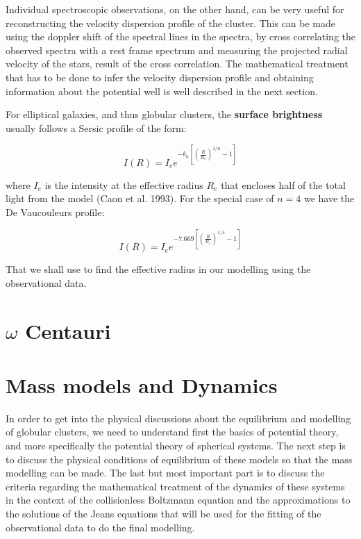 Individual spectroscopic observations, on the other hand, can be very useful for reconstructing the velocity dispersion profile of the cluster. This can be made using the doppler shift of the spectral lines in the spectra, by cross correlating the observed spectra with a rest frame spectrum and measuring the projected radial velocity of the stars, result of the cross correlation. The mathematical treatment that has to be done to infer the velocity dispersion profile and obtaining information about the potential well is well described in the next section.

For elliptical galaxies, and thus globular clusters, the \textbf{surface brightness} usually follows a Sersic profile of the form: 

\begin{equation}
I(R)=I_{e}e^{-b_{n}\left[\left(\frac{R}{R_{e}}\right)^{1/n}-1\right]}
\end{equation}

where $I_{e}$ is the intensity at the effective radius $R_{e}$ that encloses half of the total light from the model (Caon et al. 1993). For the special case of $n=4$ we have the De Vaucouleurs profile:

\begin{equation}
I(R)=I_{e}e^{-7.669\left[\left(\frac{R}{R_{e}}\right)^{1/4}-1\right]}
\end{equation}

That we shall use to find the effective radius in our modelling using the observational data.

\section{$\omega$ Centauri}

\section{Mass models and Dynamics}

In order to get into the physical discussions about the equilibrium and modelling of globular clusters, we need to understand first the basics of potential theory, and more specifically the potential theory of spherical systems. The next step is to discuss the physical conditions of equilibrium of these models so that the mass modelling can be made. The last but most important part is to discuss the criteria regarding the mathematical treatment of the dynamics of these systems in the context of the collisionless Boltzmann equation and the approximations to the solutions of the Jeans equations that will be used for the fitting of the observational data to do the final modelling.

